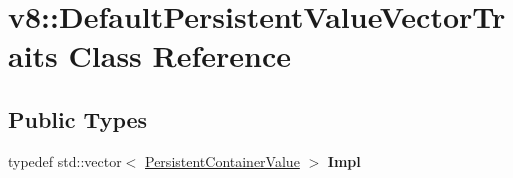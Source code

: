\hypertarget{classv8_1_1DefaultPersistentValueVectorTraits}{}\section{v8\+:\+:Default\+Persistent\+Value\+Vector\+Traits Class Reference}
\label{classv8_1_1DefaultPersistentValueVectorTraits}
\subsection*{Public Types}
\begin{DoxyCompactItemize}
\item 
\mbox{\label{classv8_1_1DefaultPersistentValueVectorTraits_ac5093f7deea6cfc8672c529be4afdef4}} 
typedef std\+::vector$<$ \mbox{\hyperlink{classuintptr__t}{Persistent\+Container\+Value}} $>$ {\bfseries Impl}
\end{DoxyCompactItemize}
